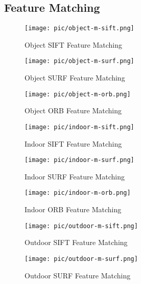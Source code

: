 \documentclass[paper=a4, fontsize=11pt]{scrartcl} %
\numberwithin{equation}{section} %
\numberwithin{figure}{section} %
\numberwithin{table}{section} %
\begin{document}

\subsection{Feature Matching}

\begin{figure}[htbp]
\centering
\texttt{[image: pic/object-m-sift.png]}
\caption{Object SIFT Feature Matching}
\label{fig:object-m-sift}
\end{figure}

\begin{figure}[htbp]
\centering
\texttt{[image: pic/object-m-surf.png]}
\caption{Object SURF Feature Matching}
\label{fig:object-m-surf}
\end{figure}

\begin{figure}[htbp]
\centering
\texttt{[image: pic/object-m-orb.png]}
\caption{Object ORB Feature Matching}
\label{fig:object-m-orb}
\end{figure}


\begin{figure}[htbp]
\centering
\texttt{[image: pic/indoor-m-sift.png]}
\caption{Indoor SIFT Feature Matching}
\label{fig:indoor-m-sift}
\end{figure}

\begin{figure}[htbp]
\centering
\texttt{[image: pic/indoor-m-surf.png]}
\caption{Indoor SURF Feature Matching}
\label{fig:indoor-m-surf}
\end{figure}

\begin{figure}[htbp]
\centering
\texttt{[image: pic/indoor-m-orb.png]}
\caption{Indoor ORB Feature Matching}
\label{fig:indoor-m-orb}
\end{figure}



\begin{figure}[htbp]
\centering
\texttt{[image: pic/outdoor-m-sift.png]}
\caption{Outdoor SIFT Feature Matching}
\label{fig:outdoor-m-sift}
\end{figure}

\begin{figure}[htbp]
\centering
\texttt{[image: pic/outdoor-m-surf.png]}
\caption{Outdoor SURF Feature Matching}
\label{fig:outdoor-m-surf}
\end{figure}
\end{document}
